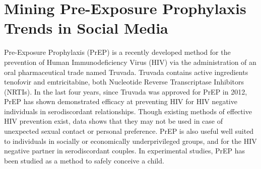 


%



\section{Mining Pre-Exposure Prophylaxis Trends in Social Media}

Pre-Exposure Prophylaxis (PrEP) is a recently developed method for the prevention of Human Immunodeficiency Virus (HIV) via the administration of an oral pharmaceutical trade named Truvada. Truvada contains active ingredients tenofovir and emtricitabine, both Nucleotide Reverse Transcriptase Inhibitors (NRTIs). In the last four years, since Truvada was approved for PrEP in 2012, PrEP has shown demonstrated efficacy at preventing HIV for HIV negative individuals in serodiscordant relationships\cite{liu2014early}. Though existing methods of effective HIV prevention exist, data shows that they may not be used in case of unexpected sexual contact or personal preference\cite{taylor2016life}. PrEP is also useful well suited to individuals in socially or economically underprivileged groups, and for the HIV negative partner in serodiscordant couples\cite{ware2012s}. In experimental studies, PrEP has been studied as a method to safely conceive a child\cite{lampe2011achieving}.

